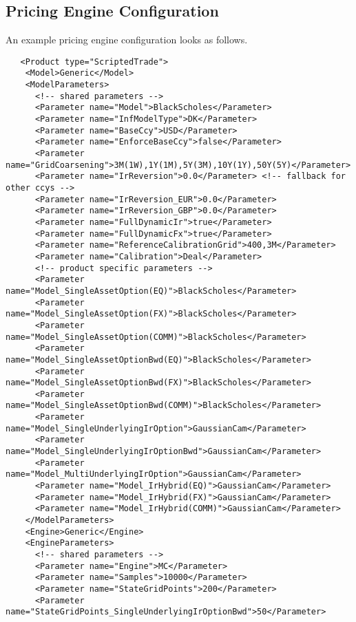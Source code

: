 \subsection{Pricing Engine Configuration}\label{pricingengine_config}

An example pricing engine configuration looks as follows.

\begin{verbatim}
   <Product type="ScriptedTrade">
    <Model>Generic</Model>
    <ModelParameters>
      <!-- shared parameters -->
      <Parameter name="Model">BlackScholes</Parameter>
      <Parameter name="InfModelType">DK</Parameter>
      <Parameter name="BaseCcy">USD</Parameter>
      <Parameter name="EnforceBaseCcy">false</Parameter>
      <Parameter name="GridCoarsening">3M(1W),1Y(1M),5Y(3M),10Y(1Y),50Y(5Y)</Parameter>
      <Parameter name="IrReversion">0.0</Parameter> <!-- fallback for other ccys -->
      <Parameter name="IrReversion_EUR">0.0</Parameter>
      <Parameter name="IrReversion_GBP">0.0</Parameter>
      <Parameter name="FullDynamicIr">true</Parameter>
      <Parameter name="FullDynamicFx">true</Parameter>
      <Parameter name="ReferenceCalibrationGrid">400,3M</Parameter>
      <Parameter name="Calibration">Deal</Parameter>
      <!-- product specific parameters -->
      <Parameter name="Model_SingleAssetOption(EQ)">BlackScholes</Parameter>
      <Parameter name="Model_SingleAssetOption(FX)">BlackScholes</Parameter>
      <Parameter name="Model_SingleAssetOption(COMM)">BlackScholes</Parameter>
      <Parameter name="Model_SingleAssetOptionBwd(EQ)">BlackScholes</Parameter>
      <Parameter name="Model_SingleAssetOptionBwd(FX)">BlackScholes</Parameter>
      <Parameter name="Model_SingleAssetOptionBwd(COMM)">BlackScholes</Parameter>
      <Parameter name="Model_SingleUnderlyingIrOption">GaussianCam</Parameter>
      <Parameter name="Model_SingleUnderlyingIrOptionBwd">GaussianCam</Parameter>
      <Parameter name="Model_MultiUnderlyingIrOption">GaussianCam</Parameter>
      <Parameter name="Model_IrHybrid(EQ)">GaussianCam</Parameter>
      <Parameter name="Model_IrHybrid(FX)">GaussianCam</Parameter>
      <Parameter name="Model_IrHybrid(COMM)">GaussianCam</Parameter>
    </ModelParameters>
    <Engine>Generic</Engine>
    <EngineParameters>
      <!-- shared parameters -->
      <Parameter name="Engine">MC</Parameter>
      <Parameter name="Samples">10000</Parameter>
      <Parameter name="StateGridPoints">200</Parameter>
      <Parameter name="StateGridPoints_SingleUnderlyingIrOptionBwd">50</Parameter>

\end{verbatim}
